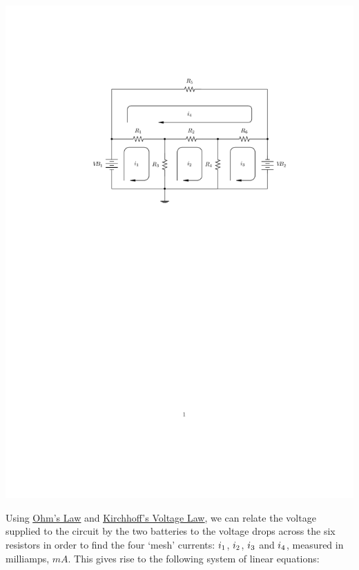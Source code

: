 \documentclass{ximera}
\begin{document}
\centerline{\includegraphics{./NonLinearInequalitiesGraphics/CircuitDiagram01.pdf}}

Using \href{http://en.wikipedia.org/wiki/Ohm's_law}{\underline{Ohm's Law}}   and \href{http://en.wikipedia.org/wiki/Kirchhoff's_circuit_laws}{\underline{Kirchhoff's Voltage Law}}, we can relate the voltage supplied to the circuit by the two batteries to the voltage drops across the six resistors in order to find the four `mesh' currents: $i_{\text{\scriptsize$1$}}$, $i_{\text{\scriptsize$2$}}$, $i_{\text{\scriptsize$3$}}$ and $i_{\text{\scriptsize$4$}}$, measured in milliamps, $mA$. This gives rise to the following system of linear equations:
\end{document}
